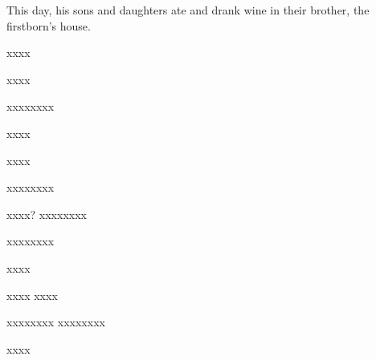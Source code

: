\begin{inparaenum}
   This day, his sons and daughters ate and drank wine in their brother, the firstborn's house.%
   \smallskip%

  \pb{}xxxx%

  \pb{}xxxx%

  {\noindent{} \smallskip}%

  \pb{}xxxx\pa{}xxxx%

  \pb{}xxxx%

  \pb{}xxxx\smallskip%

  \noindent{} \smallskip%

  \pb{}xxxx\pa{}xxxx%

  \pa{}xxxx?  xxxx\pa{}xxxx%

  \pb{}xxxx\pa{}xxxx%

  \pb{}xxxx\smallskip%

  \noindent{} xxxx\smallskip%
   xxxx%

  \pe{}xxxx\pa{}xxxx%
  \pe{}xxxx\pa{}xxxx\smallskip%

  \noindent{} xxxx%
\end{inparaenum}
